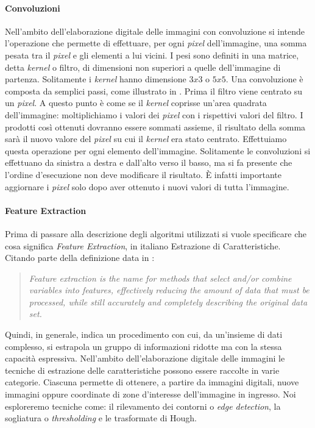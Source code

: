 \paragraph{Convoluzioni}
Nell'ambito dell'elaborazione digitale delle immagini con convoluzione si intende l'operazione che permette di effettuare, per ogni \textit{pixel} dell'immagine, una somma pesata tra il \textit{pixel} e gli elementi a lui vicini.
I pesi sono definiti in una matrice, detta \textit{kernel} o filtro, di dimensioni non superiori a quelle dell'immagine di partenza.
Solitamente i \textit{kernel} hanno dimensione $3x3$ o $5x5$.%
Una convoluzione è composta da semplici passi, come illustrato in \cite{kernel-conv}.
Prima il filtro viene centrato su un \textit{pixel}.
A questo punto è come se il \textit{kernel} coprisse un'area quadrata dell'immagine: moltiplichiamo i valori dei \textit{pixel} con i rispettivi valori del filtro.
I prodotti così ottenuti dovranno essere sommati assieme, il risultato della somma sarà il nuovo valore del \textit{pixel} su cui il \textit{kernel} era stato centrato.
Effettuiamo questa operazione per ogni elemento dell'immagine.
Solitamente le convoluzioni si effettuano da sinistra a destra e dall'alto verso il basso, ma si fa presente che l'ordine d'esecuzione non deve modificare il risultato.
È infatti importante aggiornare i \textit{pixel} solo dopo aver ottenuto i nuovi valori di tutta l'immagine.

\paragraph{Feature Extraction}
Prima di passare alla descrizione degli algoritmi utilizzati si vuole specificare che cosa significa \textit{Feature Extraction}, in italiano Estrazione di Caratteristiche.
Citando parte della definizione data in \cite{deepai-feat-ext} :
\begin{quote}
  \textit{Feature extraction is the name for methods that select and/or combine variables into features, effectively reducing the amount of data that must be processed, while still accurately and completely describing the original data set.}
\end{quote}
Quindi, in generale, indica un procedimento con cui, da un'insieme di dati complesso, si estrapola un gruppo di informazioni ridotte ma con la stessa capacità espressiva.
Nell'ambito dell'elaborazione digitale delle immagini le tecniche di estrazione delle caratteristiche possono essere raccolte in varie categorie.
Ciascuna permette di ottenere, a partire da immagini digitali, nuove immagini oppure coordinate di zone d'interesse dell'immagine in ingresso.
Noi esploreremo tecniche come: il rilevamento dei contorni o \textit{edge detection}, la sogliatura o \textit{thresholding} e le trasformate di Hough.

